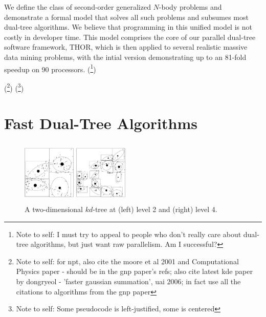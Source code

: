 \documentclass[twoside,leqno,twocolumn]{article}
\newcommand{\authornote}[1]{(\footnote{Note to self: #1})}
\newcommand{\authorsnote}[1]{\authornote{#1}}
\begin{document}

We define the class of second-order generalized $N$-body problems and demonstrate a formal model that solves all such problems and subsumes most dual-tree algorithms.
We believe that programming in this unified model is not costly in developer time.
This model comprises the core of our parallel dual-tree software framework, THOR, which is then applied to several realistic massive data mining problems, with the intial version demonstrating up to an 81-fold speedup on 90 processors.
\authorsnote{I must try to appeal to people who don't really care about dual-tree algorithms, but just want raw parallelism.  Am I successful?}

\authorsnote{for npt, also cite the moore et al 2001 and Computational Physics
 paper - should be in the gnp paper's refs; also cite latest kde paper by 
 dongryeol - 'faster gaussian summation', uai 2006; in fact use all the 
 citations to algorithms from the gnp paper}
\authorsnote{Some pseudocode is left-justified, some is centered}

\section{Fast Dual-Tree Algorithms}

\begin{figure}[t]
  \centering
  \begin{minipage}{3.2in}
    \begin{minipage}{1.05in}
      \includegraphics[width=1.0in,height=1.2in]{kdtree-level2.ps}
    \end{minipage}
    \begin{minipage}{1.05in}
      \includegraphics[width=1.0in,height=1.2in]{kdtree-level4.ps}
    \end{minipage}
    \begin{minipage}{1.0in}
      \footnotesize{\caption{\label{fig:kdtree} A two-dimensional
          $kd$-tree at (left) level 2 and (right) level 4.}}
    \end{minipage}
  \end{minipage}
\end{figure}
\end{document}
